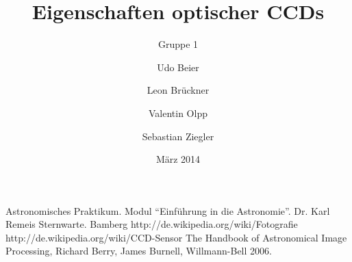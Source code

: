 
%
%


\title{Eigenschaften optischer CCDs}
\subtitle{Gruppe 1}
\date{März 2014}
\author{Udo Beier \and Leon Brückner \and Valentin Olpp \and Sebastian Ziegler}

\maketitle
\tableofcontents
\newpage
\listoffigures
\listoftables
\newpage

%





%
\newpage
%
%

\begin{thebibliography}{9}
 Astronomisches Praktikum. Modul \enquote{Einführung in die Astronomie}. Dr. Karl Remeis Sternwarte. Bamberg
 http://de.wikipedia.org/wiki/Fotografie
 http://de.wikipedia.org/wiki/CCD-Sensor
 The Handbook of Astronomical Image Processing, Richard Berry, James Burnell, Willmann-Bell 2006.
\end{thebibliography}
